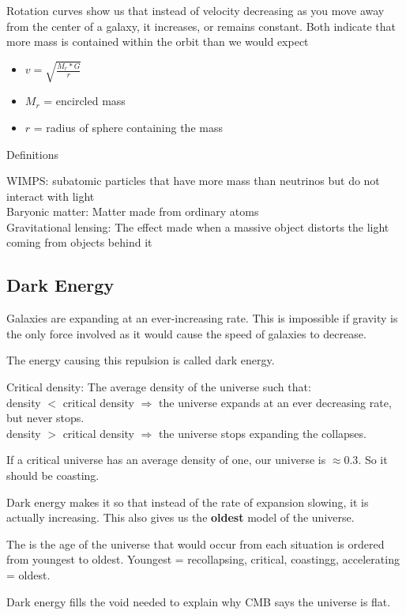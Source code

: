 Rotation curves show us that instead of velocity decreasing as you move away from the center of a galaxy, it increases, or remains constant.  Both indicate that more mass is contained within the orbit than we would expect

\begin{itemize}
\item $v = \sqrt{\frac{M_r * G}{r}}$
\item $M_r$ = encircled mass
\item $r$ = radius of sphere containing the mass
\end{itemize}

Definitions

WIMPS: subatomic particles that have more mass than neutrinos but do not interact with light \\
Baryonic matter: Matter made from ordinary atoms \\
Gravitational lensing: The effect made when a massive object distorts the light coming from objects behind it

\subsection{Dark Energy}
Galaxies are expanding at an ever-increasing rate.  This is impossible if gravity is the only force involved as it would cause the speed of galaxies to decrease.

The energy causing this repulsion is called dark energy.

Critical density: The average density of the universe such that: \\
density $<$ critical density $\Rightarrow$ the universe expands at an ever decreasing rate, but never stops. \\
density $>$ critical density $\Rightarrow$ the universe stops expanding the collapses.

If a critical universe has an average density of one, our universe is $\approx 0.3$.  So it should be coasting.

Dark energy makes it so that instead of the rate of expansion slowing, it is actually increasing.  This also gives us the \textbf{oldest} model of the universe.

The is the age of the universe that would occur from each situation is ordered from youngest to oldest.  Youngest = recollapsing, critical, coastingg, accelerating = oldest.

Dark energy fills the void needed to explain why CMB says the universe is flat.

